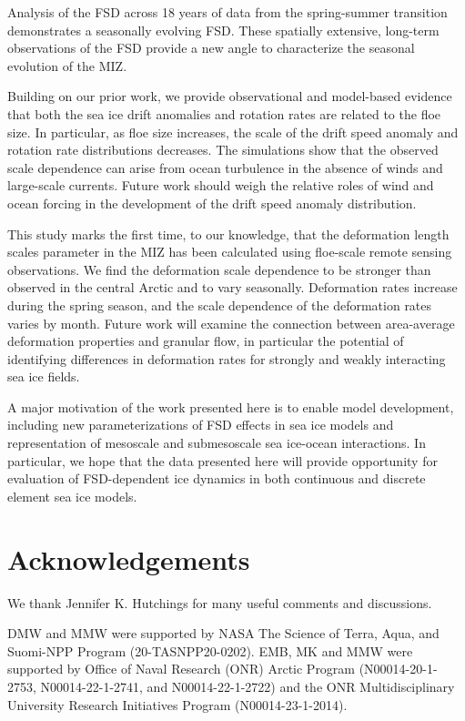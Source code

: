 \documentclass[aog]{igs}
\begin{document}
Analysis of the FSD across 18 years of data from the spring-summer transition demonstrates a seasonally evolving FSD.
These spatially extensive, long-term observations of the FSD provide a new angle to characterize the seasonal evolution of the MIZ.

Building on our prior work, we provide observational and model-based evidence that both the sea ice drift anomalies and rotation rates are related to the floe size.
In particular, as floe size increases, the scale of the drift speed anomaly and rotation rate distributions decreases.
The simulations show that the observed scale dependence can arise from ocean turbulence in the absence of winds and large-scale currents.
Future work should weigh the relative roles of wind and ocean forcing in the development of the drift speed anomaly distribution.

This study marks the first time, to our knowledge, that the deformation length scales parameter in the MIZ has been calculated using floe-scale remote sensing observations.
We find the deformation scale dependence to be stronger than observed in the central Arctic and to vary seasonally.
Deformation rates increase during the spring season, and the scale dependence of the deformation rates varies by month.
Future work will examine the connection between area-average deformation properties and granular flow, in particular the potential of identifying differences in deformation rates for strongly and weakly interacting sea ice fields.

A major motivation of the work presented here is to enable model development, including new parameterizations of FSD effects in sea ice models and representation of mesoscale and submesoscale sea ice-ocean interactions. 
In particular, we hope that the data presented here will provide opportunity for evaluation of FSD-dependent ice dynamics in both continuous and discrete element sea ice models.

\section{Acknowledgements} 
We thank Jennifer K. Hutchings for many useful comments and discussions.

DMW and MMW were supported by NASA The Science of Terra, Aqua, and Suomi-NPP Program (20-TASNPP20-0202). EMB, MK and MMW were supported by Office of Naval Research (ONR) Arctic Program (N00014-20-1-2753, N00014-22-1-2741, and N00014-22-1-2722) and the ONR Multidisciplinary University Research Initiatives Program (N00014-23-1-2014).
\end{document}
